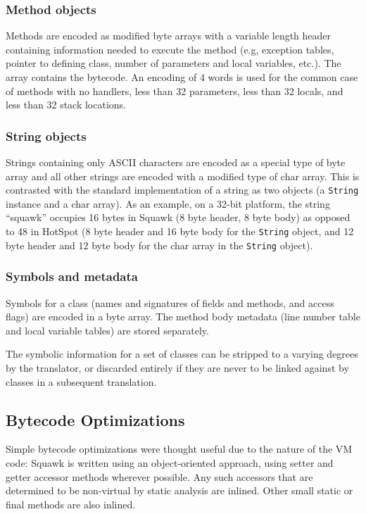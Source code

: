 \documentclass{sigplanconf}
\begin{document}
\subsubsection*{Method objects}
Methods are encoded as modified byte arrays with a variable length 
header containing information needed to execute the method (e.g, 
exception tables, pointer to defining class, number of parameters 
and local variables, etc.).   The array contains the bytecode.
An encoding of 4 words is used for the common case of methods
with no handlers, less than 32 parameters, less than 32 locals, and 
less than 32 stack locations. 


\subsubsection*{String objects}
Strings containing only ASCII characters are encoded as a special type 
of byte array and all other strings are encoded with a modified type of 
char array. This is contrasted with the standard implementation of
a string as two objects (a \texttt{String} instance and a char array). As an
example, on a 32-bit platform, the string ``squawk'' occupies 16 bytes
in Squawk (8 byte header, 8 byte body) as opposed to 48 in HotSpot
(8 byte header and 16 byte body for the \texttt{String} object, and 12 byte header
and 12 byte body for the char array in the \texttt{String} object).


\subsubsection*{Symbols and metadata}
Symbols for a class (names and signatures of fields and 
methods, and access flags) are encoded in a byte array. 
The method body metadata (line number table and local variable 
tables) are stored separately. 

The symbolic information for a set of classes can be stripped 
to a varying degrees by the translator, or discarded entirely 
if they are never to be linked against by classes in a subsequent translation.


\subsection{Bytecode Optimizations}

Simple bytecode optimizations were thought useful due to the nature of the
VM code: Squawk is written using an object-oriented approach, using
setter and getter accessor methods wherever possible. Any such
accessors that are determined to be non-virtual by static analysis are
inlined. Other small static or final methods are also inlined. 
\end{document}
